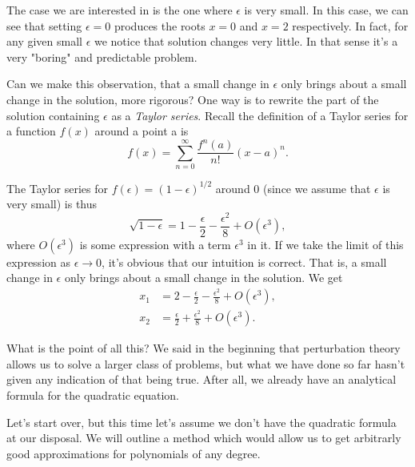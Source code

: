 \documentclass[12pt]{article}
\begin{document}
The case we are interested in is the one where $\epsilon$ is very
small. In this case, we can see that setting $\epsilon=0$ produces the
roots $x=0$ and $x=2$ respectively. In fact, for any given small
$\epsilon$ we notice that solution changes very little. In that sense
it's a very "boring" and predictable problem.

Can we make this observation, that a small change in $\epsilon$ only
brings about a small change in the solution, more rigorous? One way is
to rewrite the part of the solution containing $\epsilon$ as a
\textit{Taylor series}. Recall the definition of a Taylor series for a
function $f(x)$ around a point a is
\begin{equation}
f(x) = \sum_{n=0}^{\infty} \frac{f^{n}(a)}{n!} (x-a)^n.
\end{equation}

The Taylor series for $f(\epsilon) = (1 - \epsilon)^{1/2}$ around 0
(since we assume that $\epsilon$ is very small) is thus
\begin{equation}
\sqrt{1 - \epsilon} = 1 - \frac{\epsilon}{2} - \frac{\epsilon^2}{8} + O(\epsilon^3),
\end{equation}
where $O(\epsilon^3)$ is some expression with a term $\epsilon^3$ in
it. If we take the limit of this expression as $\epsilon \to 0$, it's
obvious that our intuition is correct. That is, a small change in
$\epsilon$ only brings about a small change in the solution. We get
\begin{align}
x_1 &= 2 - \frac{\epsilon}{2} - \frac{\epsilon^2}{8} + O(\epsilon^3), \\
x_2 &= \frac{\epsilon}{2} + \frac{\epsilon^2}{8} + O(\epsilon^3).
\end{align}

What is the point of all this? We said in the beginning that
perturbation theory allows us to solve a larger class of problems, but
what we have done so far hasn't given any indication of that being
true. After all, we already have an analytical formula for the
quadratic equation.

Let's start over, but this time let's assume we don't have the
quadratic formula at our disposal. We will outline a method which
would allow us to get arbitrarly good approximations for polynomials
of any degree.
\end{document}
